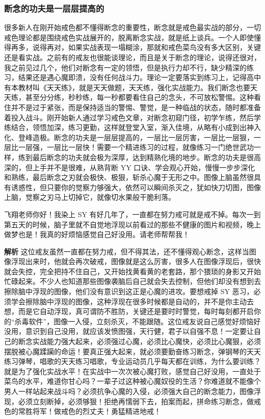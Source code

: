 \subsubsection{断念的功夫是一层层提高的}

很多新人在刚开始戒色都不懂得断念的重要性，断念就是戒色最实战的部分，一切戒色理论都是围绕戒色实战展开的，脱离断念实战，就是纸上谈兵。一个人即使懂得再多，说得再对，如果实战表现一塌糊涂，那就和戒色菜鸟没有多大区别，关键还是看实战。之前有的戒友也很能谈理论，而且是关于断念的理论，说得还很对，我之前见过几个，他们对断念有一定的领悟，但是执行力却不行，缺少精深的练习，结果还是遇心魔即溃，没有任何战斗力。理论一定要落实到练习上，记得高中有本教材叫《天天练》，就是天天做题，天天练，强化实战能力。我们断念也要天天练，甚至分分练，秒秒练，每一秒都要看住自己的念头，不可放松警惕。这种看住并不是过于紧张，而是保持适当的警惕、警觉，是一种临战的状态，随时都准备着投入战斗。刚开始新人通过学习戒色文章，对断念初窥门径，初学乍练，然后学练结合，领悟加深，练习更勤，这样就登堂入室，渐入佳境，从略有小成到出神入化、登峰造极。断念的功夫是一层层提高的，一层比一层厉害，一层比一层狠，一层比一层强，一层比一层快！需要一个精进练习的过程，就像练习一门绝世武功一样，练到最后断念的功夫就会极为深厚，达到精熟化境的地步。断念的功夫是很高深的，但上手并不是很难，从熟背断 YY 口诀、学会观心开始，慢慢一步步深化和熟练，最后断念之刃就会极快、极狠，斩杀心魔于无形之中。图像上脑虽然很具有诱惑性，但只要你的觉察力够强大，依然可以瞬间杀灭之，犹如快刀切图，图像上脑，觉察之刃马上切掉它，就像切水果般干脆利落。

\begin{case}
    飞翔老师你好！我染上 SY 有好几年了，一直都在努力戒可就是戒不掉。每次一到第五天的时候，脑子里就不自觉地浮现以前看过的那些不健康的图片和视频，晚上做梦也是！我真的好烦恼感觉自己好没用。请老师帮帮我！

    \textbf{解析} 这位戒友虽然一直都在努力戒，但不得其法，还不懂得观心断念，这样当图像浮现出来时，他就会再次破戒，图像就是这么厉害，很多人在图像浮现后，很快就会失控，完全把持不住自己，又开始找黄看黄的老套路，那个猥琐的身影又开始忙碌起来。不少人也知道那些图像袭脑后自己就会失去控制，但他们却没有想到去擦除脑中浮现的图像，他们没有意识到这正是心魔的进攻。要想戒掉 SY 恶习，必须学会擦除脑中浮现的图像，这种浮现在很多时候都是自动的，并不是你主动去想，而是它自动浮现，真可谓防不胜防，关键还是要时时警觉，每时每刻都开启你的“杀毒软件”，图像一入侵，立刻杀灭，不能跟随。这位戒友说自己感觉好烦恼好没用，意识到自己没用，就应该发愤图强，天行健，君子以自强不息！一定要让自己的断念实战能力强大起来，必须强过心魔，必须比心魔快，必须比心魔狠，必须摆脱被心魔蹂躏的命运！要真正强大起来，就必须要勤奋练习断念，弹钢琴的天天练习弹琴，唱歌的天天练习唱歌，专业运动员几乎每天都在训练，为什么要训练？就是为了强化实战水平！在实战中一次次被心魔打败，感觉自己好没用，一直处于菜鸟的水平，难道你甘心吗？一辈子过这种被心魔奴役的生活？你难道就不能像个男人一样站起来战斗吗？必须抗争心魔的入侵，必须强大自己的断念能力，图像浮现，必须立刻断掉，必须够狠！拒绝再懦弱下去，拍案而起，拼命练习断念，做戒色的常胜将军！做戒色的烈丈夫！勇猛精进地戒！
\end{case}

